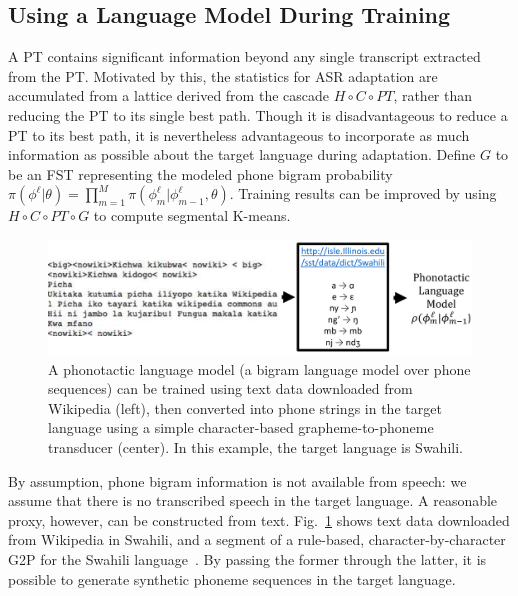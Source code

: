\subsection{Using a Language Model During Training}
\label{sec:trainwithlm}

A PT contains significant information beyond any single
transcript extracted from the PT. Motivated by this, the statistics
for ASR adaptation are accumulated from a lattice derived from the
cascade $H\circ C \circ PT$, rather than reducing the PT to its single
best path. Though it is disadvantageous to reduce a PT to its best
path, it is nevertheless advantageous to incorporate as much
information as possible about the target language during adaptation.
Define $G$ to be an FST representing the modeled phone bigram
probability
$\pi(\phi^\ell|\theta)=\prod_{m=1}^M\pi(\phi_m^\ell|\phi_{m-1}^\ell,\theta)$.
Training results can be improved by using $H\circ C\circ PT\circ G$ to
compute segmental K-means.

\begin{figure}
  \centerline{\includegraphics[width=5in]{../figs/fig_sloan.png}}
  \caption{A phonotactic language model (a bigram language model over
    phone sequences) can be trained using text data downloaded from
    Wikipedia (left), then converted into phone strings in the target
    language using a simple character-based grapheme-to-phoneme
    transducer (center).  In this example, the target language is
    Swahili.}
  \label{fig:wikitext}
\end{figure}

By assumption, phone bigram information is not available from speech:
we assume that there is no transcribed speech in the target language.
A reasonable proxy, however, can be constructed from text.
Fig.~\ref{fig:wikitext} shows text data downloaded from Wikipedia in
Swahili, and a segment of a rule-based, character-by-character G2P for
the Swahili language~\cite{Hasegawajohnson15}.  By passing the former
through the latter, it is possible to generate synthetic phoneme
sequences in the target language.

